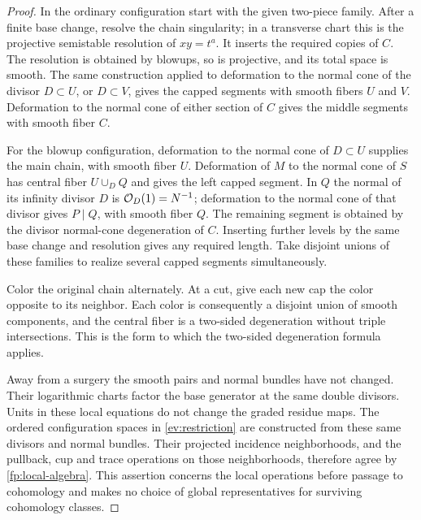 \begin{proof}
In the ordinary configuration start with the given two-piece family.
After a finite base change, resolve the chain singularity; in a
transverse chart this is the projective semistable resolution of
$xy=t^a$.  It inserts the required copies of $C$.  The resolution is
obtained by blowups, so is projective, and its total space is smooth.
The same construction applied to deformation to the normal cone of the
divisor $D\subset U$, or $D\subset V$, gives the capped segments with
smooth fibers $U$ and $V$.  Deformation to the normal cone of either
section of $C$ gives the middle segments with smooth fiber $C$.

For the blowup configuration, deformation to the normal cone of
$D\subset U$ supplies the main chain, with smooth fiber $U$.
Deformation of $M$ to the normal cone of $S$ has central fiber
$U\cup_D Q$ and gives the left capped segment.  In $Q$ the normal of
its infinity divisor $D$ is $\mathcal O_D(1)=N^{-1}$; deformation to the normal
cone of that divisor gives $P\mid Q$, with smooth fiber $Q$.  The
remaining segment is obtained by the divisor normal-cone degeneration
of $C$.  Inserting further levels by the same base change and
resolution gives any required length.  Take disjoint unions of these
families to realize several capped segments simultaneously.

Color the original chain alternately.  At a cut, give each new cap the
color opposite to its neighbor.  Each color is consequently a disjoint
union of smooth components, and the central fiber is a two-sided
degeneration without triple intersections.  This is the form to which
the two-sided degeneration formula applies.

Away from a surgery the smooth pairs and normal bundles have not
changed.  Their logarithmic charts factor the base generator at the
same double divisors.  Units in these local equations do not change
the graded residue maps.  The ordered configuration spaces in
\cref{ev:restriction} are constructed from these same divisors and
normal bundles.  Their projected incidence neighborhoods, and the
pullback, cup and trace operations on those neighborhoods, therefore
agree by \cref{fp:local-algebra}.  This assertion concerns the local
operations before passage to cohomology and makes no choice of global
representatives for surviving cohomology classes.
\end{proof}

